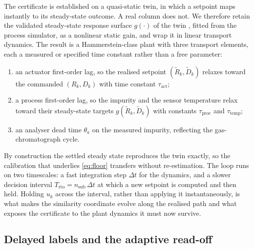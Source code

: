 The certificate is established on a quasi-static twin, in which a setpoint maps instantly to
its steady-state outcome. A real column does not. We therefore retain the validated
steady-state response surface $g(\cdot)$ of the twin \citep{busico_m3}, fitted from the
process simulator, as a nonlinear static gain, and wrap it in linear transport dynamics. The
result is a Hammerstein-class plant with three transport elements, each a measured or
specified time constant rather than a free parameter:
\begin{enumerate}
\item an actuator first-order lag, so the realised setpoint $(\tilde R_k,\tilde D_k)$ relaxes
  toward the commanded $(R_k,D_k)$ with time constant $\tau_{\mathrm{act}}$;
\item a process first-order lag, so the impurity and the sensor temperature relax toward their
  steady-state targets $g(\tilde R_k,\tilde D_k)$ with constants $\tau_{\mathrm{proc}}$ and
  $\tau_{\mathrm{temp}}$;
\item an analyser dead time $\theta_a$ on the measured impurity, reflecting the
  gas-chromatograph cycle.
\end{enumerate}
By construction the settled steady state reproduces the twin exactly, so the calibration that
underlies \eqref{eq:floor} transfers without re-estimation. The loop runs on two timescales: a
fast integration step $\Delta t$ for the dynamics, and a slower decision interval
$T_{\mathrm{rto}}=n_{\mathrm{sub}}\,\Delta t$ at which a new setpoint is computed and then held.
Holding $u_k$ across the interval, rather than applying it instantaneously, is what makes the
similarity coordinate evolve along the realised path and what exposes the certificate to the
plant dynamics it must now survive.

\subsection{Delayed labels and the adaptive read-off}
\label{sec:adaptive}

